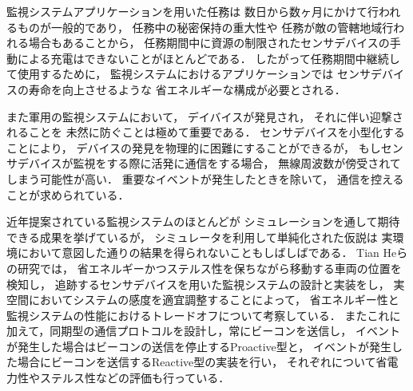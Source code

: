 
監視システムアプリケーションを用いた任務は
数日から数ヶ月にかけて行われるものが一般的であり，
任務中の秘密保持の重大性や
任務が敵の管轄地域行われる場合もあることから，
任務期間中に資源の制限されたセンサデバイスの手動による充電はできないことがほとんどである．
したがって任務期間中継続して使用するために，
監視システムにおけるアプリケーションでは
センサデバイスの寿命を向上させるような
省エネルギーな構成が必要とされる．

また軍用の監視システムにおいて，
デイバイスが発見され，
それに伴い迎撃されることを
未然に防ぐことは極めて重要である．
センサデバイスを小型化することにより，
デバイスの発見を物理的に困難にすることができるが，
もしセンサデバイスが監視をする際に活発に通信をする場合，
無線周波数が傍受されてしまう可能性が高い．
重要なイベントが発生したときを除いて，
通信を控えることが求められている．

近年提案されている監視システムのほとんどが
シミュレーションを通して期待できる成果を挙げているが，
シミュレータを利用して単純化された仮説は
実環境において意図した通りの結果を得られないこともしばしばである．
Tian Heらの研究\cite{He04energy-efficientsurveillance}では，
省エネルギーかつステルス性を保ちながら移動する車両の位置を検知し，
追跡するセンサデバイスを用いた監視システムの設計と実装をし，
実空間においてシステムの感度を適宜調整することによって，
省エネルギー性と監視システムの性能におけるトレードオフについて考察している．
またこれに加えて，同期型の通信プロトコルを設計し，常にビーコンを送信し，
イベントが発生した場合はビーコンの送信を停止するProactive型と，
イベントが発生した場合にビーコンを送信するReactive型の実装を行い，
それぞれについて省電力性やステルス性などの評価も行っている．










